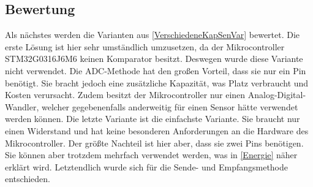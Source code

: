 \documentclass[a4paper,
DIV=13,
12pt,
BCOR=10mm,
department=FakEI,
parskip=half,
automark,
]{article}
\begin{document}
\subsection{Bewertung}
\label{Bewertung}
Als nächstes werden die Varianten aus \ref{VerschiedeneKapSenVar} bewertet. Die erste Lösung ist hier sehr umständlich umzusetzen, da der Mikrocontroller STM32G0316J6M6 keinen Komparator besitzt. Deswegen wurde diese Variante nicht verwendet. Die ADC-Methode hat den großen Vorteil, dass sie nur ein Pin benötigt. Sie bracht jedoch eine zusätzliche Kapazität, was Platz verbraucht und Kosten verursacht. Zudem besitzt der Mikrocontroller nur einen Analog-Digital-Wandler, welcher gegebenenfalls anderweitig für einen Sensor hätte verwendet werden können. Die letzte Variante ist die einfachste Variante. Sie braucht nur einen Widerstand und hat keine besonderen Anforderungen an die Hardware des Mikrocontroller. Der größte Nachteil ist hier aber, dass sie zwei Pins benötigen. Sie können aber trotzdem mehrfach verwendet werden, was in \ref{Energie} näher erklärt wird. Letztendlich wurde sich für die Sende- und Empfangsmethode entschieden.
\end{document}
